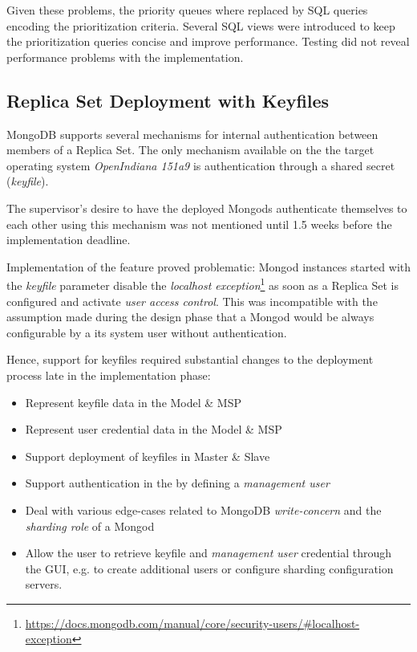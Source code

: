 Given these problems, the priority queues where replaced by SQL queries encoding the prioritization criteria.
Several SQL views were introduced to keep the prioritization queries concise and improve performance.
Testing did not reveal performance problems with the  implementation.

\subsection{Replica Set Deployment with Keyfiles}\label{:di:keyfiles}

MongoDB supports several mechanisms for internal authentication between members of a Replica Set. The only mechanism available on the
the target operating system \textit{OpenIndiana 151a9} is authentication through a shared secret (\textit{keyfile}).

The supervisor's desire to have the deployed Mongods authenticate themselves to each other using this mechanism was not mentioned 
until 1.5 weeks before the implementation deadline. %

Implementation of the feature proved problematic: Mongod instances started with the \textit{keyfile} parameter disable the 
\textit{localhost exception}\footnote{\url{https://docs.mongodb.com/manual/core/security-users/\#localhost-exception}}
as soon as a Replica Set is configured and activate \textit{user access control}. %
This was incompatible with the assumption made during the design phase that a Mongod would be always configurable by a its system user without authentication.

Hence, support for keyfiles required substantial changes to the deployment process late in the implementation phase:

\begin{itemize}
  \item Represent keyfile data in the Model \& MSP
  \item Represent user credential data in the Model \& MSP
  \item Support deployment of keyfiles in Master \& Slave
  \item Support authentication in the  by defining a \textit{management user}
  \item Deal with various edge-cases related to MongoDB \textit{write-concern} and the \textit{sharding role} of a Mongod
  \item Allow the user to retrieve keyfile and \textit{management user} credential through the GUI,
        e.g. to create additional users or configure sharding configuration servers.
\end{itemize}

